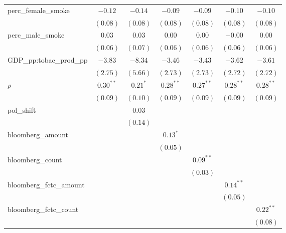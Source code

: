 \begin{table}[!h]
\begin{center}
\begin{tabular}{l c c c c c c }
perc\_female\_smoke     & $-0.12$     & $-0.14$    & $-0.09$     & $-0.09$     & $-0.10$     & $-0.10$     \\
                        & $(0.08)$    & $(0.08)$   & $(0.08)$    & $(0.08)$    & $(0.08)$    & $(0.08)$    \\
perc\_male\_smoke       & $0.03$      & $0.03$     & $0.00$      & $0.00$      & $-0.00$     & $0.00$      \\
                        & $(0.06)$    & $(0.07)$   & $(0.06)$    & $(0.06)$    & $(0.06)$    & $(0.06)$    \\
GDP\_pp:tobac\_prod\_pp & $-3.83$     & $-8.34$    & $-3.46$     & $-3.43$     & $-3.62$     & $-3.61$     \\
                        & $(2.75)$    & $(5.66)$   & $(2.73)$    & $(2.73)$    & $(2.72)$    & $(2.72)$    \\
$\rho$                  & $0.30^{**}$ & $0.21^{*}$ & $0.28^{**}$ & $0.27^{**}$ & $0.28^{**}$ & $0.28^{**}$ \\
                        & $(0.09)$    & $(0.10)$   & $(0.09)$    & $(0.09)$    & $(0.09)$    & $(0.09)$    \\
pol\_shift              &             & $0.03$     &             &             &             &             \\
                        &             & $(0.14)$   &             &             &             &             \\
bloomberg\_amount       &             &            & $0.13^{*}$  &             &             &             \\
                        &             &            & $(0.05)$    &             &             &             \\
bloomberg\_count        &             &            &             & $0.09^{**}$ &             &             \\
                        &             &            &             & $(0.03)$    &             &             \\
bloomberg\_fctc\_amount &             &            &             &             & $0.14^{**}$ &             \\
                        &             &            &             &             & $(0.05)$    &             \\
bloomberg\_fctc\_count  &             &            &             &             &             & $0.22^{**}$ \\
                        &             &            &             &             &             & $(0.08)$    \\

\end{tabular}
\end{center}
\end{table}
